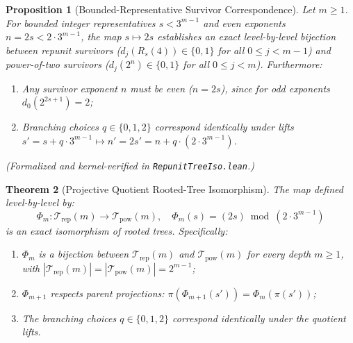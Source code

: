 \documentclass[11pt,reqno]{amsart}
\theoremstyle{plain}
\newtheorem{theorem}{Theorem}[section]
\newtheorem{proposition}[theorem]{Proposition}
\theoremstyle{definition}
\theoremstyle{remark}
\newcommand{\Trep}{\mathcal{T}_{\mathrm{rep}}}
\newcommand{\Tpow}{\mathcal{T}_{\mathrm{pow}}}
\begin{document}
\begin{proposition}[Bounded-Representative Survivor Correspondence]\label{prop:rep_tree_iso}
Let $m \ge 1$. For bounded integer representatives $s < 3^{m-1}$ and even exponents $n = 2s < 2 \cdot 3^{m-1}$, the map $s \mapsto 2s$ establishes an exact level-by-level bijection between repunit survivors ($d_j(R_s(4)) \in \{0, 1\}$ for all $0 \le j < m-1$) and power-of-two survivors ($d_j(2^n) \in \{0, 1\}$ for all $0 \le j < m$). Furthermore:
\begin{enumerate}
    \item Any survivor exponent $n$ must be even ($n = 2s$), since for odd exponents $d_0(2^{2s+1}) = 2$;
    \item Branching choices $q \in \{0, 1, 2\}$ correspond identically under lifts $s' = s + q \cdot 3^{m-1} \mapsto n' = 2s' = n + q \cdot (2 \cdot 3^{m-1})$.
\end{enumerate}
\emph{(Formalized and kernel-verified in \texttt{RepunitTreeIso.lean}.)}
\end{proposition}

\begin{theorem}[Projective Quotient Rooted-Tree Isomorphism]\label{thm:tree_iso}
The map defined level-by-level by:
\begin{equation}
\Phi_m : \Trep(m) \to \Tpow(m), \quad \Phi_m(s) = (2 s) \bmod (2 \cdot 3^{m-1})
\end{equation}
is an exact isomorphism of rooted trees. Specifically:
\begin{enumerate}
    \item $\Phi_m$ is a bijection between $\Trep(m)$ and $\Tpow(m)$ for every depth $m \ge 1$, with $|\Trep(m)| = |\Tpow(m)| = 2^{m-1}$;
    \item $\Phi_{m+1}$ respects parent projections: $\pi(\Phi_{m+1}(s')) = \Phi_m(\pi(s'))$;
    \item The branching choices $q \in \{0, 1, 2\}$ correspond identically under the quotient lifts.
\end{enumerate}
\end{theorem}
\end{document}
